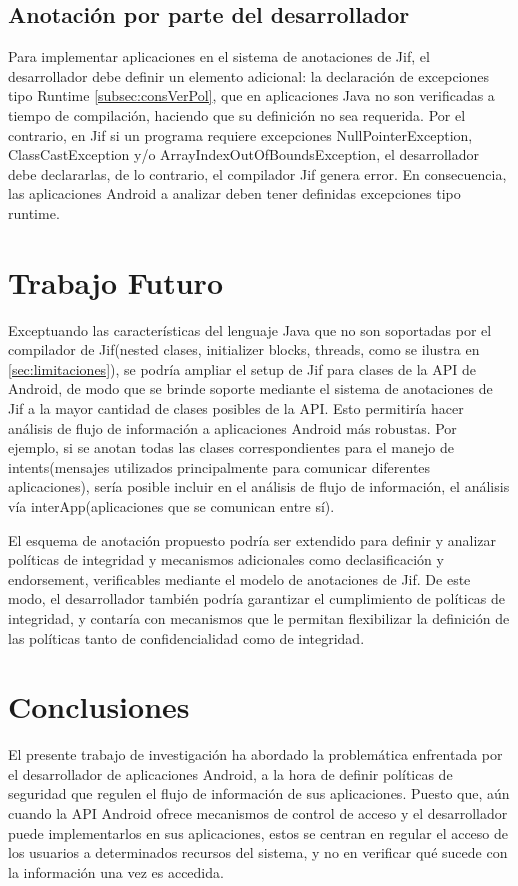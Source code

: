 \subsection{Anotación por parte del desarrollador}
\label{subsec:cambios}
Para implementar aplicaciones en el sistema de anotaciones de Jif, el
desarrollador debe definir un elemento adicional: la declaración de
excepciones tipo Runtime \ref{subsec:consVerPol}, que en aplicaciones Java no
son verificadas a tiempo de compilación, haciendo que su definición no sea requerida. 
Por el contrario, en Jif si un programa requiere excepciones
NullPointerException, ClassCastException y/o ArrayIndexOutOfBoundsException, el
desarrollador debe declararlas, de lo contrario, el compilador Jif genera
error.
En consecuencia, las aplicaciones Android a analizar deben tener definidas
excepciones tipo runtime.

\section{Trabajo Futuro}

Exceptuando las características del lenguaje Java que no son soportadas por el
compilador de Jif(nested clases, initializer blocks, threads, como se ilustra en
 \ref{sec:limitaciones}), se podría ampliar el setup de Jif para clases de la
 API de Android, de modo que se brinde soporte mediante el sistema de anotaciones de
Jif a la mayor cantidad de clases posibles de la API.
Esto permitiría hacer análisis de flujo de información a aplicaciones
Android más robustas. Por ejemplo, si se anotan todas las clases
correspondientes para el manejo de intents(mensajes utilizados principalmente
para comunicar diferentes aplicaciones), sería posible incluir en el análisis de
flujo de información, el análisis vía interApp(aplicaciones que se comunican
entre sí). 

El esquema de anotación propuesto podría ser
extendido para definir y analizar políticas de integridad y mecanismos adicionales como declasificación y
endorsement, verificables mediante el modelo de anotaciones de Jif. De este modo,
el desarrollador también podría garantizar el cumplimiento de políticas de
integridad, y contaría con mecanismos que le permitan flexibilizar la definición
de las políticas tanto de confidencialidad como de integridad.

\section{Conclusiones}
El presente trabajo de investigación ha abordado la problemática enfrentada por
el desarrollador de aplicaciones Android, a la hora de definir políticas de
seguridad que regulen el flujo de información de sus aplicaciones. Puesto que,
aún cuando la API Android ofrece mecanismos de control de acceso y el
desarrollador puede implementarlos en sus aplicaciones, estos se centran en
regular el acceso de los usuarios a determinados recursos del sistema, y no en
verificar qué sucede con la información una vez es accedida.

